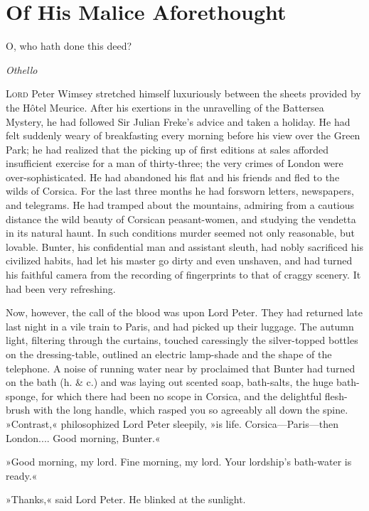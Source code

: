 


\chapter{Of His Malice Aforethought}

\epigraph{O, who hath done this deed?}{\textit{Othello}}


\lettrine[lines=4]{L}{ord} Peter Wimsey stretched himself luxuriously be\-tween the sheets provided by the Hôtel Meurice. After his exertions in the unravelling of the Battersea Mystery, he had followed Sir Julian Freke's advice and taken a holiday. He had felt suddenly weary of breakfasting every morning before his view over the Green Park; he had realized that the picking up of first editions at sales afforded insufficient exercise for a man of thirty-three; the very crimes of London were over-sophisticated. He had abandoned his flat and his friends and fled to the wilds of Corsica. For the last three months he had forsworn letters, newspapers, and telegrams. He had tramped about the mountains, admiring from a cautious distance the wild beauty of Corsican peasant-women, and studying the vendetta in its natural haunt. In such conditions murder seemed not only reasonable, but lovable. Bunter, his confidential man and assistant sleuth, had nobly sacrificed his civilized habits, had let his master go dirty and even unshaven, and had turned his faithful camera from the recording of fingerprints to that of craggy scenery. It had been very refreshing.

Now, however, the call of the blood was upon Lord Peter. They had returned late last night in a vile train to Paris, and had picked up their luggage. The autumn light, filtering through the curtains, touched caressingly the silver-topped bottles on the dressing-table, outlined an electric lamp-shade and the shape of the telephone. A noise of running water near by proclaimed that Bunter had turned on the bath (h. \& c.) and was laying out scented soap, bath-salts, the huge bath-sponge, for which there had been no scope in Corsica, and the delightful flesh-brush with the long handle, which rasped you so agreeably all down the spine. »Contrast,« philosophized Lord Peter sleepily, »is life. Corsica\allowbreak---\allowbreak Paris---then London.... Good morning, Bunter.«

»Good morning, my lord. Fine morning, my lord. Your lordship's bath-water is ready.«

»Thanks,« said Lord Peter. He blinked at the sunlight.

